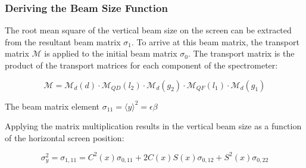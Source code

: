 
\subsubsection{Deriving the Beam Size Function}

The root mean square of the vertical beam size on the screen can be extracted
from the resultant beam matrix \(\sigma_1\).  To arrive at this beam matrix, the
transport matrix \(\mathcal{M}\) is applied to the initial beam matrix
\(\sigma_0\). The transport matrix is the product of the transport matrices for
each component of the spectrometer:

\begin{equation}
	\mathcal{M} = \mathcal{M}_d(d) \cdot \mathcal{M}_{QD}(l_2) \cdot \mathcal{M}_d(g_2)
				  \cdot \mathcal{M}_{QF}(l_1) \cdot \mathcal{M}_d(g_1)
\end{equation}


The beam matrix element \(\sigma_{11} = \langle y \rangle^2 = \epsilon\beta\)

Applying the matrix multiplication results in the vertical beam size as a
function of the horizontal screen position:

\begin{equation}
	\sigma_y^2 = \sigma_{1,11} = C^2(x)\sigma_{0,11} + 2C(x)S(x)\sigma_{0,12}
								+ S^2(x)\sigma_{0,22}
\end{equation}

